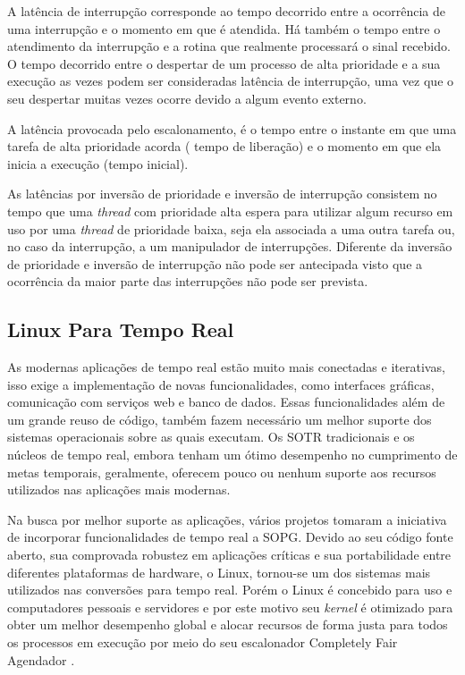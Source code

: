 A latência de interrupção corresponde ao tempo decorrido entre a ocorrência de uma interrupção e o momento em que é atendida. Há também o tempo entre o atendimento da interrupção e a rotina que realmente processará o sinal recebido. O tempo decorrido entre o despertar de um processo de alta prioridade e a sua execução as vezes podem ser consideradas latência de interrupção, uma vez que o seu despertar muitas vezes ocorre devido a algum evento externo. 

A latência provocada pelo escalonamento, é o tempo entre o instante em que uma tarefa de alta prioridade acorda ( tempo de liberação) e o momento em que ela inicia a execução (tempo inicial). 

As latências por inversão de prioridade e inversão de interrupção consistem no tempo que uma \textit{thread} com prioridade alta espera para utilizar algum recurso em uso por uma \textit{thread} de prioridade baixa, seja ela associada a uma outra tarefa ou, no caso da interrupção, a um manipulador de interrupções. Diferente da inversão de prioridade e inversão de interrupção não pode ser antecipada visto que a ocorrência da maior parte das interrupções não pode ser prevista.

\subsection{Linux Para Tempo Real}
As modernas aplicações de tempo real estão muito mais conectadas e iterativas, isso exige a implementação de novas funcionalidades, como interfaces gráficas, comunicação com serviços web e banco de dados. Essas funcionalidades além de um grande reuso de código, também fazem necessário um melhor suporte dos sistemas operacionais sobre as quais executam. Os SOTR tradicionais e os núcleos de tempo real, embora tenham um ótimo desempenho no cumprimento de metas temporais, geralmente, oferecem pouco ou nenhum suporte aos recursos utilizados nas aplicações mais modernas.

Na busca por melhor suporte as aplicações, vários projetos tomaram a iniciativa de incorporar funcionalidades de tempo real a SOPG. Devido ao seu código fonte aberto, sua comprovada robustez em aplicações críticas e sua portabilidade entre diferentes plataformas de hardware, o Linux, tornou-se um dos sistemas mais utilizados nas conversões para tempo real. Porém o Linux é concebido para uso e computadores pessoais e servidores e por este motivo seu \textit{kernel} é otimizado para obter um melhor desempenho global e alocar recursos de forma justa para todos os processos em execução por meio do seu escalonador Completely Fair Agendador \cite{cfs}. 


